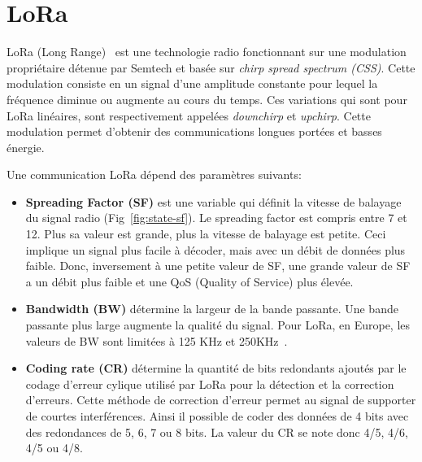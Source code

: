 \section{LoRa}\label{sec:etat_art-lora}
\renewcommand{\rightmark}{LoRa}

LoRa (Long Range)~\cite{sx1276:datasheet}\cite{paper:lora-reverse-engineering} est une technologie radio  fonctionnant sur une modulation propriétaire détenue par Semtech et basée sur \textit{chirp spread spectrum (CSS)}. Cette modulation consiste en un signal d'une amplitude constante pour lequel la fréquence diminue ou augmente au cours du temps. Ces variations qui sont pour LoRa linéaires, sont respectivement appelées \textit{downchirp} et \textit{upchirp}. Cette modulation permet d'obtenir des communications longues portées et basses énergie.

Une communication LoRa dépend des paramètres suivants:
\begin{itemize}
    \item \textbf{Spreading Factor (SF)} est une variable qui définit la vitesse de balayage du signal radio
    (Fig~\ref{fig:state-sf}). Le spreading factor est compris entre 7 et 12. Plus sa valeur est grande, plus la vitesse de balayage est petite. Ceci implique un signal plus facile à décoder, mais avec un débit de données plus faible. Donc, inversement à une petite valeur de SF, une grande valeur de SF a un débit plus faible et une QoS (Quality of Service) plus élevée.
    
    \item \textbf{Bandwidth (BW)} détermine la largeur de la bande passante. Une bande passante plus large augmente la qualité du signal. Pour LoRa, en Europe, les valeurs de BW sont limitées à 125 KHz et 250KHz~\cite{lora-frequencyplan}.
    
    \item \textbf{Coding rate (CR)} détermine la quantité de bits redondants ajoutés par le codage d'erreur cylique utilisé par LoRa pour la détection et la correction d'erreurs. Cette méthode de correction d'erreur permet au signal de supporter de courtes interférences. Ainsi il possible de coder des données de 4 bits avec des redondances de 5, 6, 7 ou 8 bits. La valeur du CR se note donc 4/5, 4/6, 4/5 ou 4/8.
    
\end{itemize}

